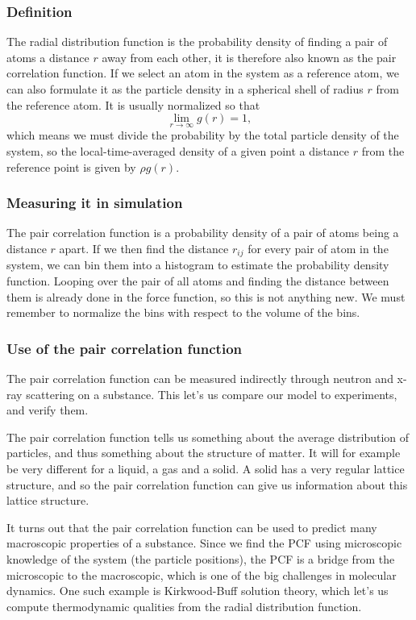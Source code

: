 \documentclass[a4paper, 11pt, notitlepage, english]{article}
\begin{document}
\subsubsection*{Definition}

The radial distribution function is the probability density of finding a pair of atoms a distance $r$ away from each other, it is therefore also known as the pair correlation function. If we select an atom in the system as a reference atom, we can also formulate it as the particle density in a spherical shell of radius $r$ from the reference atom. It is usually normalized so that
$$\lim_{r\to \infty} g(r) = 1,$$
which means we must divide the probability by the total particle density of the system, so the local-time-averaged density of a given point a distance $r$ from the reference point is given by $\rho g(r)$.

\subsubsection*{Measuring it in simulation}

The pair correlation function is a probability density of a pair of atoms being a distance $r$ apart. If we then find the distance $r_{ij}$ for every pair of atom in the system, we can bin them into a histogram to estimate the probability density function. Looping over the pair of all atoms and finding the distance between them is already done in the force function, so this is not anything new. We must remember to normalize the bins with respect to the volume of the bins.

\subsubsection*{Use of the pair correlation function}

The pair correlation function can be measured indirectly through neutron and x-ray scattering on a substance. This let's us compare our model to experiments, and verify them.

The pair correlation function tells us something about the average distribution of particles, and thus something about the structure of matter. It will for example be very different for a liquid, a gas and a solid. A solid has a very regular lattice structure, and so the pair correlation function can give us information about this lattice structure.

It turns out that the pair correlation function can be used to predict many macroscopic properties of a substance. Since we find the PCF using microscopic knowledge of the system (the particle positions), the PCF is a bridge from the microscopic to the macroscopic, which is one of the big challenges in molecular dynamics. One such example is Kirkwood-Buff solution theory, which let's us compute thermodynamic qualities from the radial distribution function.
\end{document}

